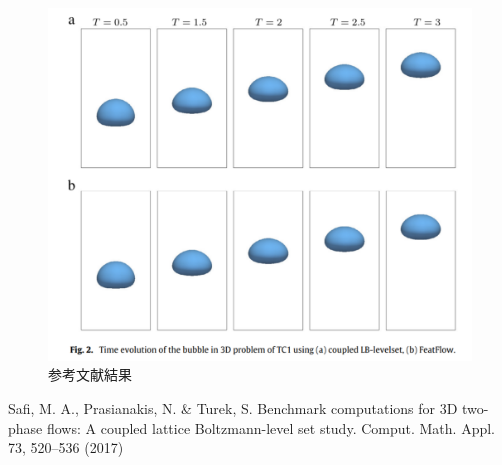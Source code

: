 \documentclass[8pt,a4paper]{article}
\begin{document}
\begin{figure}[htbp]
	\centering
	\includegraphics[width=10truecm]{pics/3d-bubble/result-ref.pdf}
	\caption{参考文献結果~\cite{Safi2017}}
	\label{fig:3d-bubble-result-ref}
\end{figure}

\begin{thebibliography}{99}
	 Safi, M. A., Prasianakis, N. \& Turek, S. Benchmark computations for 3D two-phase flows: A coupled lattice Boltzmann-level set study. Comput. Math. Appl. 73, 520–536 (2017)
\end{thebibliography}
\end{document}
